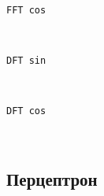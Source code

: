 \documentclass[11pt]{article}
\begin{document}
    \begin{center}
    \end{center}
    { \hspace*{\fill} \\}
    
    \begin{Verbatim}[commandchars=\\\{\}]
FFT cos

    \end{Verbatim}

    \begin{center}
    \end{center}
    { \hspace*{\fill} \\}
    
    \begin{Verbatim}[commandchars=\\\{\}]
DFT sin

    \end{Verbatim}

    \begin{center}
    \end{center}
    { \hspace*{\fill} \\}
    
    \begin{Verbatim}[commandchars=\\\{\}]
DFT cos

    \end{Verbatim}

    \begin{center}
    \end{center}
    { \hspace*{\fill} \\}
    
    \subsection{Перцептрон}\label{ux43fux435ux440ux446ux435ux43fux442ux440ux43eux43d}
\end{document}
